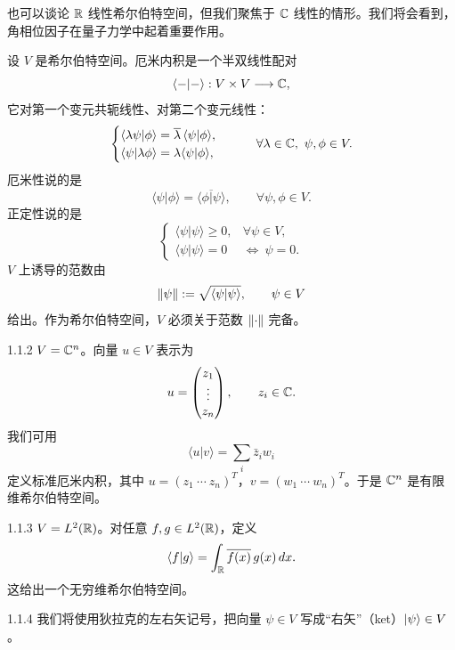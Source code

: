 也可以谈论 $\mathbb{R}$ 线性希尔伯特空间，但我们聚焦于 $\mathbb{C}$ 线性的情形。我们将会看到，角相位因子在量子力学中起着重要作用。

设 $V$ 是希尔伯特空间。厄米内积是一个半双线性配对
\[
\langle-|-\rangle:V\times V\longrightarrow\mathbb{C},
\]
它对第一个变元共轭线性、对第二个变元线性：
\[
\begin{cases}
\langle\lambda\psi|\phi\rangle=\overline{\lambda}\,\langle\psi|\phi\rangle,\\
\langle\psi|\lambda\phi\rangle=\lambda\langle\psi|\phi\rangle,
\end{cases}
\qquad \forall\lambda\in\mathbb{C},\ \psi,\phi\in V.
\]
厄米性说的是
\[
\langle\psi|\phi\rangle=\overline{\langle\phi|\psi\rangle},
\qquad \forall\psi,\phi\in V.
\]
正定性说的是
\[
\begin{cases}
\langle\psi|\psi\rangle\ge 0,&\forall\psi\in V,\\
\langle\psi|\psi\rangle=0&\Longleftrightarrow\ \psi=0.
\end{cases}
\]
$V$ 上诱导的范数由
\[
\lVert \psi\rVert:=\sqrt{\langle\psi|\psi\rangle},\qquad \psi\in V
\]
给出。作为希尔伯特空间，$V$ 必须关于范数 $\lVert \cdot\rVert$ 完备。

\begin{example}{1.1.2}
  $V=\mathbb{C}^n$。向量 $u\in V$ 表示为
  \[
  u=\begin{pmatrix}z_1\\ \vdots\\ z_n\end{pmatrix},\qquad z_i\in\mathbb{C}.
  \]
  我们可用
  \[
  \langle u|v\rangle=\sum_i \bar z_i w_i
  \]
  定义标准厄米内积，其中 $u=(z_1\ \cdots\ z_n)^T$，$v=(w_1\ \cdots\ w_n)^T$。于是 $\mathbb{C}^n$ 是有限维希尔伯特空间。
\end{example}

\begin{example}{1.1.3}
  $V=L^2(\mathbb{R})$。对任意 $f,g\in L^2(\mathbb{R})$，定义
  \[
  \langle f|g\rangle=\int_{\mathbb{R}} \overline{f(x)}\,g(x)\,d x.
  \]
  这给出一个无穷维希尔伯特空间。
\end{example}

\begin{remark}{1.1.4}
  我们将使用狄拉克的左右矢记号，把向量 $\psi\in V$ 写成“右矢”（ket）$|\psi\rangle\in V$。
\end{remark}

